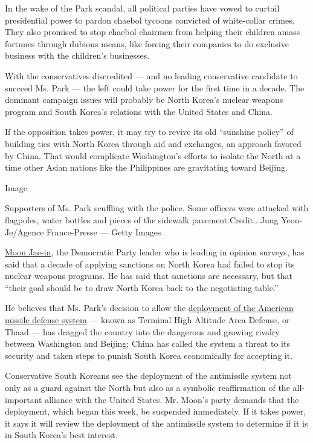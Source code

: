 In the wake of the Park scandal, all political parties have vowed to
curtail presidential power to pardon chaebol tycoons convicted of
white-collar crimes. They also promised to stop chaebol chairmen from
helping their children amass fortunes through dubious means, like
forcing their companies to do exclusive business with the children's
businesses.

With the conservatives discredited --- and no leading conservative
candidate to succeed Ms. Park --- the left could take power for the
first time in a decade. The dominant campaign issues will probably be
North Korea's nuclear weapons program and South Korea's relations with
the United States and China.

If the opposition takes power, it may try to revive its old ``sunshine
policy'' of building ties with North Korea through aid and exchanges, an
approach favored by China. That would complicate Washington's efforts to
isolate the North at a time other Asian nations like the Philippines are
gravitating toward Beijing.

Image

Supporters of Ms. Park scuffling with the police. Some officers were
attacked with flagpoles, water bottles and pieces of the sidewalk
pavement.Credit...Jung Yeon-Je/Agence France-Presse --- Getty Images

\href{https://www.nytimes.com/2016/12/09/world/asia/south-korea-who-could-replace-park.html}{Moon
Jae-in}, the Democratic Party leader who is leading in opinion surveys,
has said that a decade of applying sanctions on North Korea had failed
to stop its nuclear weapons programs. He has said that sanctions are
necessary, but that ``their goal should be to draw North Korea back to
the negotiating table.''

He believes that Ms. Park's decision to allow the
\href{https://www.nytimes.com/2017/03/06/world/asia/north-korea-thaad-missile-defense-us-china.html}{deployment
of the American missile defense system} --- known as Terminal High
Altitude Area Defense, or Thaad --- has dragged the country into the
dangerous and growing rivalry between Washington and Beijing; China has
called the system a threat to its security and taken steps to punish
South Korea economically for accepting it.

Conservative South Koreans see the deployment of the antimissile system
not only as a guard against the North but also as a symbolic
reaffirmation of the all-important alliance with the United States. Mr.
Moon's party demands that the deployment, which began this week, be
suspended immediately. If it takes power, it says it will review the
deployment of the antimissile system to determine if it is in South
Korea's best interest.


